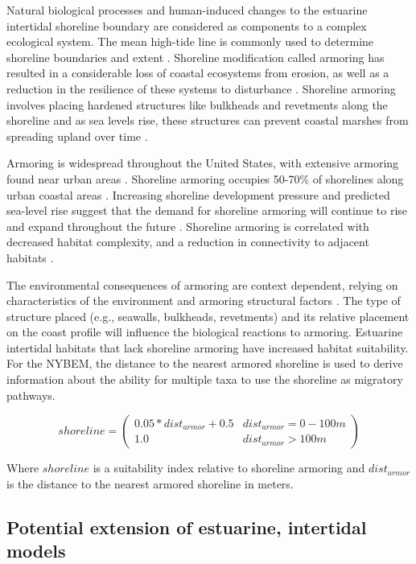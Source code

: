 \documentclass[
]{book}
\begin{document}
Natural biological processes and human-induced changes to the estuarine intertidal shoreline boundary are considered as components to a complex ecological system. The mean high-tide line is commonly used to determine shoreline boundaries and extent \citep{kittinger_shoreline_2010}. Shoreline modification called armoring has resulted in a considerable loss of coastal ecosystems from erosion, as well as a reduction in the resilience of these systems to disturbance \citep{kittinger_shoreline_2010}. Shoreline armoring involves placing hardened structures like bulkheads and revetments along the shoreline and as sea levels rise, these structures can prevent coastal marshes from spreading upland over time \citep{gardner_is_2021}.

Armoring is widespread throughout the United States, with extensive armoring found near urban areas \citep{morley_ecological_2012}. Shoreline armoring occupies 50-70\% of shorelines along urban coastal areas \citep{dugan_generalizing_2018}. Increasing shoreline development pressure and predicted sea-level rise suggest that the demand for shoreline armoring will continue to rise and expand throughout the future \citep{gardner_is_2021}. Shoreline armoring is correlated with decreased habitat complexity, and a reduction in connectivity to adjacent habitats \citep{morley_ecological_2012}.

The environmental consequences of armoring are context dependent, relying on characteristics of the environment and armoring structural factors \citep{dugan_generalizing_2018}. The type of structure placed (e.g., seawalls, bulkheads, revetments) and its relative placement on the coast profile will influence the biological reactions to armoring. Estuarine intertidal habitats that lack shoreline armoring have increased habitat suitability. For the NYBEM, the distance to the nearest armored shoreline is used to derive information about the ability for multiple taxa to use the shoreline as migratory pathways.

\[shoreline = \begin{pmatrix} 0.05*dist_{armor}+0.5 & dist_{armor}=0-100m\\
1.0 & dist_{armor}>100m
\end{pmatrix}\]

Where \(shoreline\) is a suitability index relative to shoreline armoring and \(dist_{armor}\) is the distance to the nearest armored shoreline in meters.

\hypertarget{potential-extension-of-estuarine-intertidal-models}{%
\subsection{Potential extension of estuarine, intertidal models}\label{potential-extension-of-estuarine-intertidal-models}}
\end{document}
